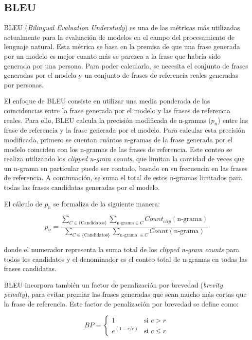 \documentclass[11pt,spanish,listoffigures,listoftables]{tfgetsinf}
\begin{document}
\subsection{BLEU}

BLEU (\textit{Bilingual Evaluation Understudy}) \cite{papineni-etal-2002-bleu} es una de las métricas más utilizadas actualmente para la evaluación de modelos en el campo del procesamiento de lenguaje natural. Esta métrica se basa en la premisa de que una frase generada por un modelo es mejor cuanto más se parezca a la frase que habría sido generada por una persona. Para poder calcularla, se necesita el conjunto de frases generadas por el modelo y un conjunto de frases de referencia reales generadas por personas.

El enfoque de BLEU consiste en utilizar una media ponderada de las coincidencias entre la frase generada por el modelo y las frases de referencia reales. Para ello, BLEU calcula la precisión modificada de n-gramas ($p_n$) entre las frase de referencia y la frase generada por el modelo. Para calcular esta precisión modificada, primero se cuentan cuántos n-gramas de la frase generada por el modelo coinciden con los n-gramas de las frases de referencia. Este conteo se realiza utilizando los \textit{clipped n-gram counts}, que limitan la cantidad de veces que un n-grama en particular puede ser contado, basado en su frecuencia en las frases de referencia. A continuación, se suma el total de estos n-gramas limitados para todas las frases candidatas generadas por el modelo.

El cálculo de $p_n$ se formaliza de la siguiente manera:

\begin{equation}
p_n = \frac{\sum_{C \in \{\text{Candidatos}\}} \sum_{\text{n-grama} \in C} Count_{clip}(\text{n-grama})}{\sum_{C \in \{\text{Candidatos}\}} \sum_{\text{n-grama }\in C} Count(\text{n-grama})}
\end{equation}

donde el numerador representa la suma total de los \textit{clipped n-gram counts} para todos los candidatos y el denominador es el conteo total de n-gramas en todas las frases candidatas.

BLEU incorpora también un factor de penalización por brevedad (\textit{brevity penalty}), para evitar premiar las frases generadas que sean mucho más cortas que la frase de referencia. Este factor de penalización por brevedad se define como:

\begin{equation}
BP = 
\begin{cases}
	1 & \text{si } c > r \\
	e^{(1-r/c)} & \text{si } c \le r
\end{cases}
\end{equation}
\end{document}
